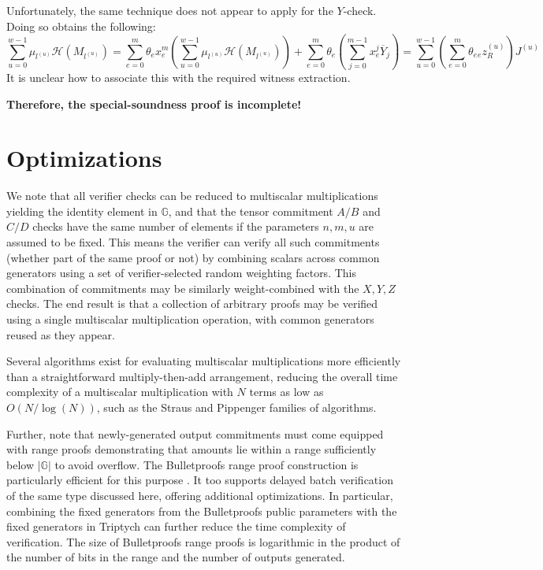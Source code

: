 \documentclass[draft]{article}
\newcommand{\G}{\mathbb{G}}
\newcommand{\hp}{\mathcal{H}}
\newcommand{\sumj}{\sum_{j=0}^{m-1}}
\newcommand{\sumu}{\sum_{u=0}^{w-1}}
\begin{document}
Unfortunately, the same technique does not appear to apply for the $Y$-check. Doing so obtains the following:
$$\sumu \mu_{l^{(u)}} \hp(M_{l^{(u)}}) = \sum_{e=0}^m \theta_ex_e^m \left( \sumu \mu_{l^{(u)}} \hp(M_{l^{(u)}}) \right) + \sum_{e=0}^m \theta_e \left( \sumj x_e^j \overline{Y}_j \right) = \sumu \left( \sum_{e=0}^m \theta_e {}_ez^{(u)}_R \right) J^{(u)}$$
It is unclear how to associate this with the required witness extraction.

\textbf{Therefore, the special-soundness proof is incomplete!}


\section{Optimizations}
We note that all verifier checks can be reduced to multiscalar multiplications yielding the identity element in $\G$, and that the tensor commitment $A/B$ and $C/D$ checks have the same number of elements if the parameters $n,m,u$ are assumed to be fixed.
This means the verifier can verify all such commitments (whether part of the same proof or not) by combining scalars across common generators using a set of verifier-selected random weighting factors.
This combination of commitments may be similarly weight-combined with the $X,Y,Z$ checks.
The end result is that a collection of arbitrary proofs may be verified using a single multiscalar multiplication operation, with common generators reused as they appear.

Several algorithms exist for evaluating multiscalar multiplications more efficiently than a straightforward multiply-then-add arrangement, reducing the overall time complexity of a multiscalar multiplication with $N$ terms as low as $O(N/\log(N))$, such as the Straus \cite{straus} and Pippenger \cite{pippenger} families of algorithms.

Further, note that newly-generated output commitments must come equipped with range proofs demonstrating that amounts lie within a range sufficiently below $|\G|$ to avoid overflow.
The Bulletproofs range proof construction is particularly efficient for this purpose \cite{bulletproofs}.
It too supports delayed batch verification of the same type discussed here, offering additional optimizations.
In particular, combining the fixed generators from the Bulletproofs public parameters with the fixed generators in Triptych can further reduce the time complexity of verification.
The size of Bulletproofs range proofs is logarithmic in the product of the number of bits in the range and the number of outputs generated.




\end{document}

